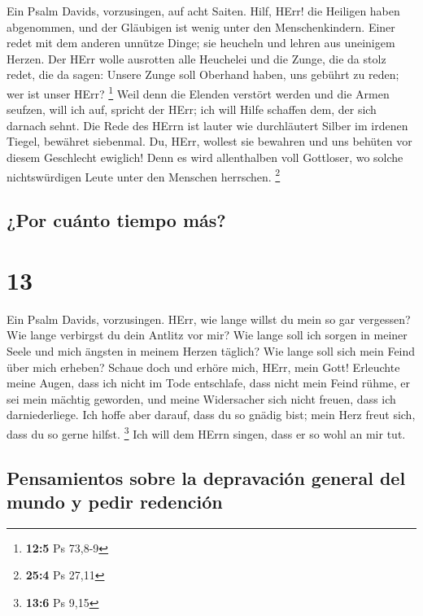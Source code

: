  Ein Psalm Davids, vorzusingen, auf acht Saiten.
 Hilf, HErr! die Heiligen haben abgenommen, und der
Gläubigen ist wenig unter den Menschenkindern.  Einer
redet mit dem anderen unnütze Dinge; sie heucheln und lehren aus
uneinigem Herzen.  Der HErr wolle ausrotten alle Heuchelei
und die Zunge, die da stolz redet,  die da sagen: Unsere
Zunge soll Oberhand haben, uns gebührt zu reden; wer ist unser HErr?
\footnote{\textbf{12:5} Ps 73,8-9}  Weil denn die Elenden
verstört werden und die Armen seufzen, will ich auf, spricht der HErr;
ich will Hilfe schaffen dem, der sich darnach sehnt.  Die
Rede des HErrn ist lauter wie durchläutert Silber im irdenen Tiegel,
bewähret siebenmal.  Du, HErr, wollest sie bewahren und
uns behüten vor diesem Geschlecht ewiglich!  Denn es wird
allenthalben voll Gottloser, wo solche nichtswürdigen Leute unter den
Menschen herrschen. \footnote{\textbf{25:4} Ps 27,11}

\hypertarget{por-cuuxe1nto-tiempo-muxe1s}{%
\subsection{¿Por cuánto tiempo más?}\label{por-cuuxe1nto-tiempo-muxe1s}}

\hypertarget{section-12}{%
\section{13}\label{section-12}}

 Ein Psalm Davids, vorzusingen.  HErr, wie
lange willst du mein so gar vergessen? Wie lange verbirgst du dein
Antlitz vor mir?  Wie lange soll ich sorgen in meiner
Seele und mich ängsten in meinem Herzen täglich? Wie lange soll sich
mein Feind über mich erheben?  Schaue doch und erhöre
mich, HErr, mein Gott! Erleuchte meine Augen, dass ich nicht im Tode
entschlafe,  dass nicht mein Feind rühme, er sei mein
mächtig geworden, und meine Widersacher sich nicht freuen, dass ich
darniederliege.  Ich hoffe aber darauf, dass du so gnädig
bist; mein Herz freut sich, dass du so gerne hilfst. \footnote{\textbf{13:6}
  Ps 9,15}  Ich will dem HErrn singen, dass er so wohl an
mir tut.

\hypertarget{pensamientos-sobre-la-depravaciuxf3n-general-del-mundo-y-pedir-redenciuxf3n}{%
\subsection{Pensamientos sobre la depravación general del mundo y pedir
redención}\label{pensamientos-sobre-la-depravaciuxf3n-general-del-mundo-y-pedir-redenciuxf3n}}

